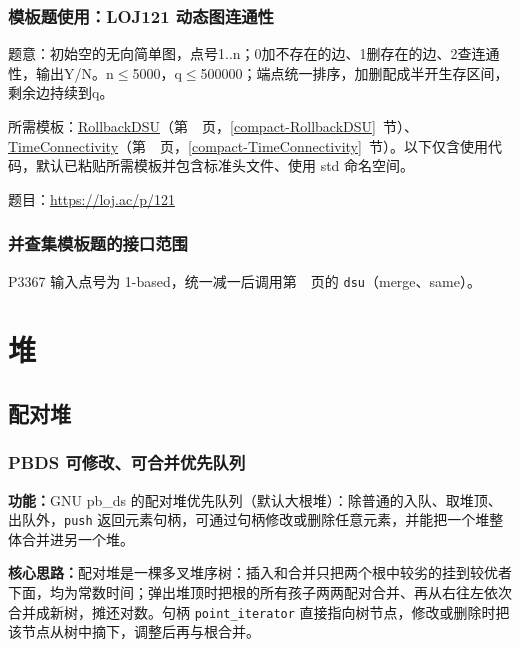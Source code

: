 \Needspace{554pt}

\subsection*{模板题使用：LOJ121 动态图连通性}

\label{usage-example-393}

题意：初始空的无向简单图，点号1..n；0加不存在的边、1删存在的边、2查连通性，输出Y/N。n$\le$5000，q$\le$500000；端点统一排序，加删配成半开生存区间，剩余边持续到q。

所需模板：\hyperref[compact-RollbackDSU]{RollbackDSU}（第~\pageref{compact-RollbackDSU}~页，\ref{compact-RollbackDSU}~节）、\hyperref[compact-TimeConnectivity]{TimeConnectivity}（第~\pageref{compact-TimeConnectivity}~页，\ref{compact-TimeConnectivity}~节）。以下仅含使用代码，默认已粘贴所需模板并包含标准头文件、使用 std 命名空间。

题目：\url{https://loj.ac/p/121}



\subsection{并查集模板题的接口范围}\label{knowledge-dsu-template}
P3367 输入点号为 1-based，统一减一后调用第~\pageref{compact-dsu}~页的 \texttt{dsu}（merge、same）。



\Needspace{342pt}

\chapter{堆}

\section{配对堆}

\subsection{PBDS 可修改、可合并优先队列}\label{compact-pheap}

\noindent\textbf{功能：}\allowbreak GNU pb\_ds 的配对堆优先队列（默认大根堆）：除普通的入队、取堆顶、出队外，\texttt{push} 返回元素句柄，可通过句柄修改或删除任意元素，并能把一个堆整体合并进另一个堆。

\textbf{核心思路：}\allowbreak 配对堆是一棵多叉堆序树：插入和合并只把两个根中较劣的挂到较优者下面，均为常数时间；弹出堆顶时把根的所有孩子两两配对合并、再从右往左依次合并成新树，摊还对数。句柄 \texttt{point\_iterator} 直接指向树节点，修改或删除时把该节点从树中摘下，调整后再与根合并。



